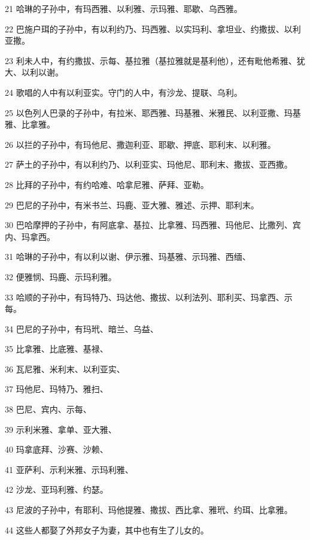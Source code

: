 \par 21 哈琳的子孙中，有玛西雅、以利雅、示玛雅、耶歇、乌西雅。
\par 22 巴施户珥的子孙中，有以利约乃、玛西雅、以实玛利、拿坦业、约撒拔、以利亚撒。
\par 23 利未人中，有约撒拔、示每、基拉雅（基拉雅就是基利他），还有毗他希雅、犹大、以利以谢。
\par 24 歌唱的人中有以利亚实。守门的人中，有沙龙、提联、乌利。
\par 25 以色列人巴录的子孙中，有拉米、耶西雅、玛基雅、米雅民、以利亚撒、玛基雅、比拿雅。
\par 26 以拦的子孙中，有玛他尼、撒迦利亚、耶歇、押底、耶利末、以利雅。
\par 27 萨土的子孙中，有以利约乃、以利亚实、玛他尼、耶利末、撒拔、亚西撒。
\par 28 比拜的子孙中，有约哈难、哈拿尼雅、萨拜、亚勒。
\par 29 巴尼的子孙中，有米书兰、玛鹿、亚大雅、雅述、示押、耶利末。
\par 30 巴哈摩押的子孙中，有阿底拿、基拉、比拿雅、玛西雅、玛他尼、比撒列、宾内、玛拿西。
\par 31 哈琳的子孙中，有以利以谢、伊示雅、玛基雅、示玛雅、西缅、
\par 32 便雅悯、玛鹿、示玛利雅。
\par 33 哈顺的子孙中，有玛特乃、玛达他、撒拔、以利法列、耶利买、玛拿西、示每。
\par 34 巴尼的子孙中，有玛玳、暗兰、乌益、
\par 35 比拿雅、比底雅、基禄、
\par 36 瓦尼雅、米利末、以利亚实、
\par 37 玛他尼、玛特乃、雅扫、
\par 38 巴尼、宾内、示每、
\par 39 示利米雅、拿单、亚大雅、
\par 40 玛拿底拜、沙赛、沙赖、
\par 41 亚萨利、示利米雅、示玛利雅、
\par 42 沙龙、亚玛利雅、约瑟。
\par 43 尼波的子孙中，有耶利、玛他提雅、撒拔、西比拿、雅玳、约珥、比拿雅。
\par 44 这些人都娶了外邦女子为妻，其中也有生了儿女的。



